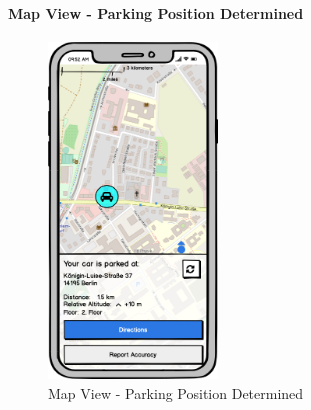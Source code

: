 \paragraph{Map View - Parking Position Determined}

\begin{figure}[h]
    \centering
    \includegraphics[width=0.4\textwidth]{images/UI/Iteration4-MapView-ParkingPositionDetermined.png}
    \caption{Map View - Parking Position Determined}
    \label{fig:mv-parking}
\end{figure}

